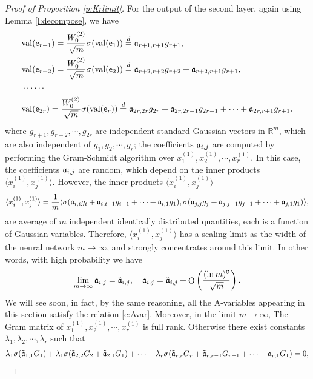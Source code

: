 \documentclass{article}
\numberwithin{equation}{section}
\newcommand{\fC}{{\mathtt C}}
\newcommand{\fa}{{\frak a}}
\newcommand{\sfe}{{\mathsf e}}
\newcommand{\bR}{{\mathbb R}}
\newcommand{\la}{\lambda}
\DeclareMathOperator{\OO}{O}
\newcommand{\1}{\mathds{1}}
\theoremstyle{plain} %
\newcommand{\val}{{\rm val}}
\begin{document}
\begin{proof}[Proof of Proposition \ref{p:Krlimit}]
For the output of the second layer, again using Lemma \ref{l:decompose}, we have
\begin{align*}\begin{split}
&\val(\sfe_{r+1})=\frac{W_0^{(2)}}{\sqrt m}\sigma(\val( \sfe_1))\stackrel{d}{=}\fa_{r+1,r+1}g_{r+1},\\
&\val( \sfe_{r+2})=\frac{W_0^{(2)}}{\sqrt m}\sigma(\val( \sfe_2))\stackrel{d}{=}\fa_{r+2,r+2}g_{r+2}+\fa_{r+2,r+1}g_{r+1},\\
&\cdots\cdots\\
&\val( \sfe_{2r})=\frac{W_0^{(2)}}{\sqrt m}\sigma(\val( \sfe_r))\stackrel{d}{=}\fa_{2r,2r}g_{2r}+\fa_{2r,2r-1}g_{2r-1}+\cdots+\fa_{2r,r+1}g_{r+1}.
\end{split}\end{align*}
where $g_{r+1}, g_{r+2},\cdots, g_{2r}$ are independent standard Gaussian vectors in $\bR^m$, which are also independent of $g_1,g_2,\cdots, g_r$; the coefficients $\fa_{i,j}$ are computed by performing the Gram-Schmidt algorithm over $x^{(1)}_1,x^{(1)}_2,\cdots,x^{(1)}_r$. In this case, the coefficients $\fa_{i,j}$ are random, which depend on the inner products $\langle x^{(1)}_i, x^{(1)}_j\rangle$. However, the inner products $\langle x^{(1)}_i, x^{(1)}_j\rangle$ 
\begin{align*}
\langle x^{(1)}_i, x^{(1)}_j\rangle
=\frac{1}{m}\langle\sigma(\fa_{i,i}g_i+\fa_{i,i-1}g_{i-1}+\cdots+\fa_{i,1}g_1) , \sigma(\fa_{j,j}g_j+\fa_{j,j-1}g_{j-1}+\cdots+\fa_{j,1}g_1)\rangle,
\end{align*}
are average of $m$ independent identically distributed quantities, each is a function of Gaussian variables. Therefore, $\langle x_i^{(1)}, x_j^{(1)}\rangle$ has a scaling limit as the width of the neural network $m\rightarrow \infty$, and strongly concentrates around this limit. In other words, with high probability we have
\begin{align}\label{e:Avar}
\lim_{m\rightarrow \infty}\fa_{i,j}=\tilde \fa_{i,j}, \quad \fa_{i,j}=\tilde \fa_{i,j}+\OO\left(\frac{(\ln m)^{\fC}}{\sqrt m}\right).
\end{align}
We will see soon, in fact, by the same reasoning, all the A-variables appearing in this section satisfy the relation \eqref{e:Avar}. Moreover, in the limit $m\rightarrow \infty$, The Gram matrix of $x_1^{(1)}, x_2^{(1)}, \cdots, x_r^{(1)}$ is full rank. Otherwise there exist constants $\la_1, \la_2,\cdots,\la_r$ such that
\begin{align}\label{e:exp}
\la_1 \sigma(\tilde \fa_{1,1}G_{1})+\la_1 \sigma(\tilde \fa_{2,2}G_{2}+\tilde\fa_{2,1}G_{1})+\cdots +\la_r \sigma(\tilde \fa_{r,r}G_r+\tilde \fa_{r,r-1}G_{r-1}+\cdots+\fa_{r,1}G_{1})=0,

\end{align}
\end{proof}
\end{document}
